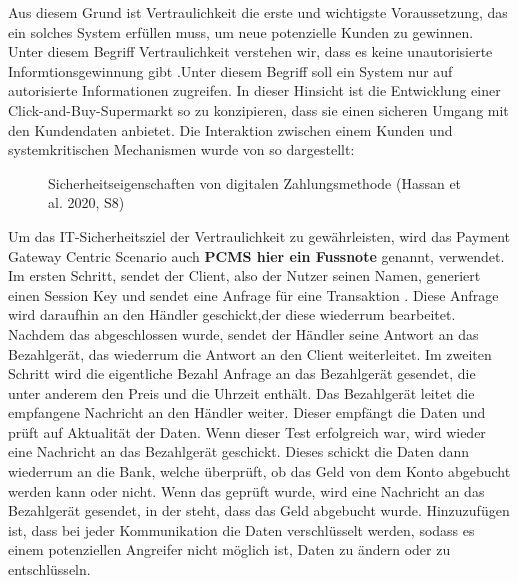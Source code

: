 Aus diesem Grund ist Vertraulichkeit die erste und wichtigste Voraussetzung, das ein solches System 
erfüllen muss, um neue potenzielle Kunden zu gewinnen. Unter diesem Begriff Vertraulichkeit verstehen wir, 
dass es keine unautorisierte Informtionsgewinnung gibt \cite{refbook:SWIS} .Unter diesem Begriff soll
ein System nur auf autorisierte Informationen zugreifen. In dieser Hinsicht ist die Entwicklung 
einer Click-and-Buy-Supermarkt so zu konzipieren, dass sie einen sicheren Umgang mit den Kundendaten
anbietet. Die Interaktion zwischen einem Kunden und systemkritischen Mechanismen wurde von
\cite{refart:HARE} so dargestellt:

\vfill
\begin{figure}[htb]
    \caption{Sicherheitseigenschaften von digitalen Zahlungsmethode (Hassan et al. 2020, S8)}
    \label{fig:refark_HARE}
\end{figure}
\vfill


Um das IT-Sicherheitsziel der Vertraulichkeit zu gewährleisten, wird das Payment Gateway Centric Scenario 
auch \textbf{PCMS hier ein Fussnote} genannt, verwendet. Im ersten Schritt, sendet der Client, also der Nutzer 
seinen Namen, generiert einen Session Key und sendet eine Anfrage für eine Transaktion \cite{refart:JTAS}. 
Diese Anfrage wird daraufhin an den Händler geschickt,der diese wiederrum bearbeitet. Nachdem das abgeschlossen 
wurde, sendet der Händler seine Antwort an das Bezahlgerät, das wiederrum die Antwort an den Client weiterleitet.
Im zweiten Schritt wird die eigentliche Bezahl Anfrage an das Bezahlgerät gesendet, die unter anderem 
den Preis und die Uhrzeit enthält. Das Bezahlgerät leitet die empfangene Nachricht an den Händler weiter. 
Dieser empfängt die Daten und prüft auf Aktualität der Daten. Wenn dieser Test erfolgreich war, 
wird wieder eine Nachricht an das Bezahlgerät geschickt. Dieses schickt die Daten dann wiederrum 
an die Bank, welche überprüft, ob das Geld von dem Konto abgebucht werden kann oder nicht.
Wenn das geprüft wurde, wird eine Nachricht an das Bezahlgerät gesendet, in der steht, dass das
Geld abgebucht wurde. Hinzuzufügen ist, dass bei jeder Kommunikation die Daten verschlüsselt werden, 
sodass es einem potenziellen Angreifer nicht möglich ist, Daten zu ändern oder zu entschlüsseln.

